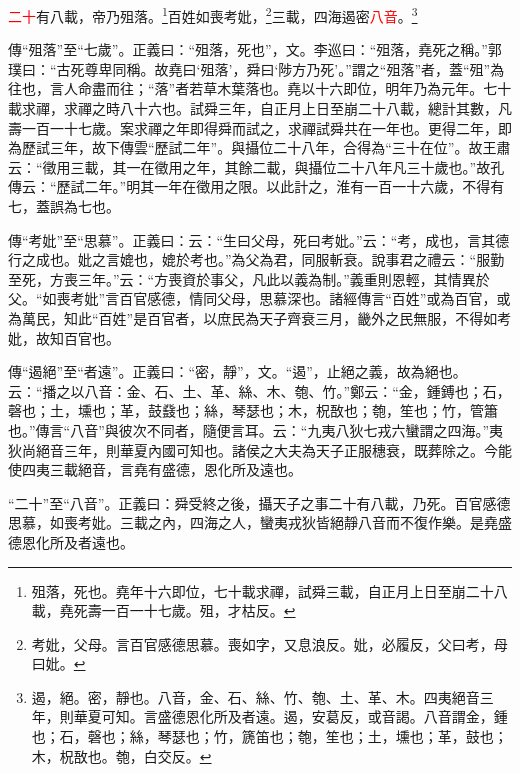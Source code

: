 \textcolor{red}{二十}有八載，帝乃殂落。\footnote{殂落，死也。堯年十六即位，七十載求禪，試舜三載，自正月上日至崩二十八載，堯死壽一百一十七歲。殂，才枯反。}百姓如喪考妣，\footnote{考妣，父母。言百官感德思慕。喪如字，又息浪反。妣，必履反，父曰考，母曰妣。}三載，四海遏密\textcolor{red}{八音}。\footnote{遏，絕。密，靜也。八音，金、石、絲、竹、匏、土、革、木。四夷絕音三年，則華夏可知。言盛德恩化所及者遠。遏，安葛反，或音謁。八音謂金，鍾也；石，磬也；絲，琴瑟也；竹，篪笛也；匏，笙也；土，壎也；革，鼓也；木，柷敔也。匏，白交反。}

{\noindent\zhuan{}\fzbyks 傳“殂落”至“七歲”。正義曰：“殂落，死也”，文。李巡曰：“殂落，堯死之稱。”郭璞曰：“古死尊卑同稱。故堯曰‘殂落’，舜曰‘陟方乃死’。”謂之“殂落”者，蓋“殂”為往也，言人命盡而往；“落”者若草木葉落也。堯以十六即位，明年乃為元年。七十載求禪，求禪之時八十六也。試舜三年，自正月上日至崩二十八載，總計其數，凡壽一百一十七歲。案求禪之年即得舜而試之，求禪試舜共在一年也。更得二年，即為歷試三年，故下傳雲“歷試二年”。與攝位二十八年，合得為“三十在位”。故王肅云：“徵用三載，其一在徵用之年，其餘二載，與攝位二十八年凡三十歲也。”故孔傳云：“歷試二年。”明其一年在徵用之限。以此計之，淮有一百一十六歲，不得有七，蓋誤為七也。 \par}

{\noindent\zhuan{}\fzbyks 傳“考妣”至“思慕”。正義曰：云：“生曰父母，死曰考妣。”云：“考，成也，言其德行之成也。妣之言媲也，媲於考也。”為父為君，同服斬衰。說事君之禮云：“服勤至死，方喪三年。”云：“方喪資於事父，凡此以義為制。”義重則恩輕，其情異於父。“如喪考妣”言百官感德，情同父母，思慕深也。諸經傳言“百姓”或為百官，或為萬民，知此“百姓”是百官者，以庶民為天子齊衰三月，畿外之民無服，不得如考妣，故知百官也。 \par}

{\noindent\zhuan{}\fzbyks 傳“遏絕”至“者遠”。正義曰：“密，靜”，文。“遏”，止絕之義，故為絕也。云：“播之以八音：金、石、土、革、絲、木、匏、竹。”鄭云：“金，鍾鎛也；石，磬也；土，壎也；革，鼓鼗也；絲，琴瑟也；木，柷敔也；匏，笙也；竹，管簫也。”傳言“八音”與彼次不同者，隨便言耳。云：“九夷八狄七戎六蠻謂之四海。”夷狄尚絕音三年，則華夏內國可知也。諸侯之大夫為天子正服穗衰，既葬除之。今能使四夷三載絕音，言堯有盛德，恩化所及遠也。 \par}

{\noindent\shu{}\fzkt “二十”至“八音”。正義曰：舜受終之後，攝天子之事二十有八載，乃死。百官感德思慕，如喪考妣。三載之內，四海之人，蠻夷戎狄皆絕靜八音而不復作樂。是堯盛德恩化所及者遠也。 \par}

